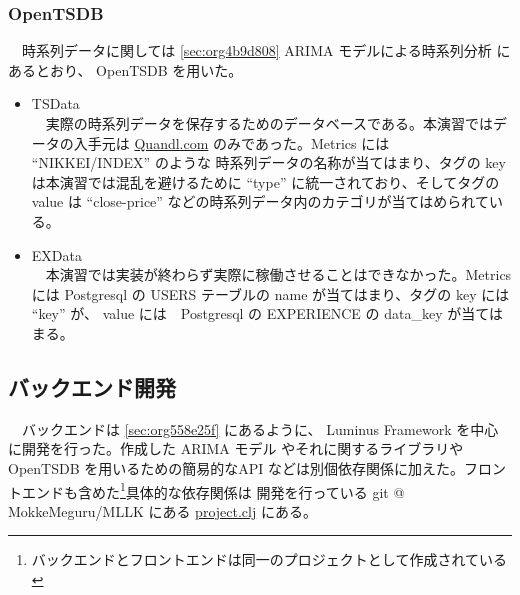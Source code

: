 \documentclass{scrartcl}
\begin{document}
\subsubsection{OpenTSDB}
\label{sec:org11960d7}
　時系列データに関しては \ref{sec:org4b9d808} ARIMA モデルによる時系列分析 にあるとおり、 OpenTSDB を用いた。\\
\begin{itemize}
\item TSData\\
　実際の時系列データを保存するためのデータベースである。本演習ではデータの入手元は \href{https://www.quandl.com/}{Quandl.com} のみであった。Metrics には ``NIKKEI/INDEX'' のような 時系列データの名称が当てはまり、タグの key は本演習では混乱を避けるために ``type'' に統一されており、そしてタグの value は ``close-price'' などの時系列データ内のカテゴリが当てはめられている。\\
\item EXData\\
　本演習では実装が終わらず実際に稼働させることはできなかった。Metrics には Postgresql の USERS テーブルの name が当てはまり、タグの key には ``key'' が、 value には　Postgresql の EXPERIENCE の data\_key が当てはまる。\\
\end{itemize}

\subsection{バックエンド開発}
\label{sec:orgf6655ce}
　バックエンドは \ref{sec:org558e25f} にあるように、 Luminus Framework を中心に開発を行った。作成した ARIMA モデル やそれに関するライブラリや OpenTSDB を用いるための簡易的なAPI などは別個依存関係に加えた。フロントエンドも含めた\footnote{バックエンドとフロントエンドは同一のプロジェクトとして作成されている}具体的な依存関係は 開発を行っている git @ MokkeMeguru/MLLK にある \href{https://github.com/MokkeMeguru/MLLK/blob/master/project.clj}{project.clj} にある。\\
\end{document}
